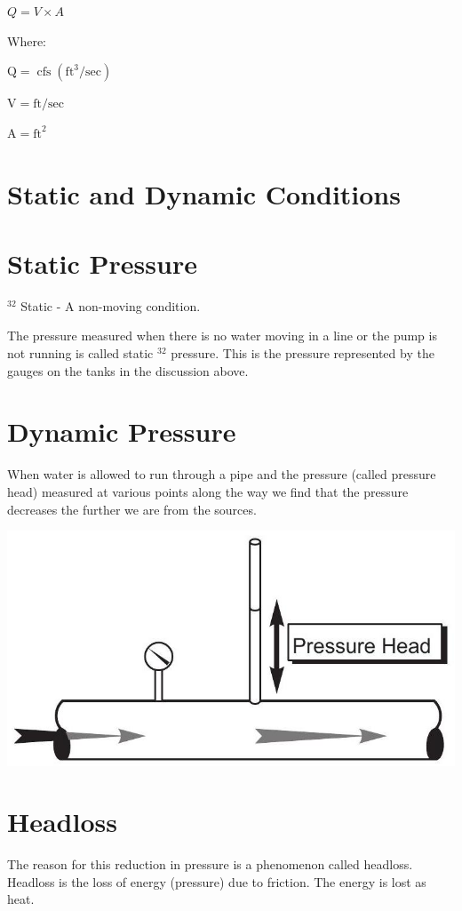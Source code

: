 \documentclass[10pt]{article}
\begin{document}
$Q=V \times A$

Where:

$\mathrm{Q}=\operatorname{cfs}\left(\mathrm{ft}^{3} / \mathrm{sec}\right)$

$\mathrm{V}=\mathrm{ft} / \mathrm{sec}$

$\mathrm{A}=\mathrm{ft}^{2}$

\section{Static and Dynamic Conditions}
\section{Static Pressure}
${ }^{32}$ Static - A non-moving condition.

The pressure measured when there is no water moving in a line or the pump is not running is called static $^{32}$ pressure. This is the pressure represented by the gauges on the tanks in the discussion above.

\section{Dynamic Pressure}
When water is allowed to run through a pipe and the pressure (called pressure head) measured at various points along the way we find that the pressure decreases the further we are from the sources.

\includegraphics[max width=\textwidth]{2022_11_03_65aa625ded296bdfd01fg-18(1)}

\section{Headloss}
The reason for this reduction in pressure is a phenomenon called headloss. Headloss is the loss of energy (pressure) due to friction. The energy is lost as heat.
\end{document}
